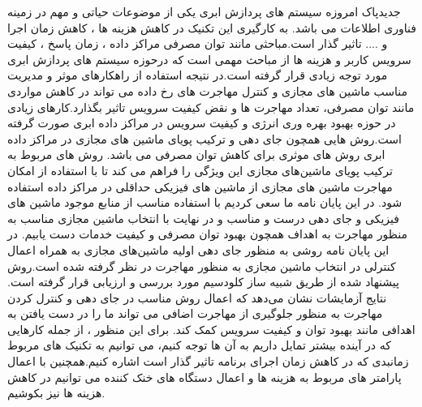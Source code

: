 ‌جدید‌پاک
امروزه سیستم های پردازش ابری یکی از موضوعات حیاتی و مهم در زمینه فناوری اطلاعات می باشد. به کارگیری این تکنیک در کاهش هزینه ها ، کاهش زمان اجرا و .... تاثیر گذار است.مباحثی مانند توان مصرفی مراکز داده ، زمان پاسخ ، کیفیت سرویس کاربر و هزینه  ها از مباحث مهمی است که درحوزه سیستم های پردازش ابری مورد توجه زیادی قرار گرفته است.در نتیجه استفاده از راهکارهای موثر و مدیریت مناسب ماشین های مجازی و کنترل مهاجرت های رخ داده می تواند در کاهش مواردی مانند توان مصرفی، تعداد مهاجرت ها و نقض کیفیت سرویس تاثیر بگذارد.کارهای زیادی در حوزه  بهبود بهره وری انرژی و کیفیت سرویس در مراکز داده ابری صورت گرفته است.روش هایی همچون جای دهی و ترکیب پویای ماشین های مجازی در مراکز داده ابری روش های موثری برای کاهش توان مصرفی می باشد. روش های مربوط به ترکیب پویای ماشین‌های مجازی این ویژگی را فراهم می کند تا با استفاده از امکان مهاجرت ماشین های مجازی از ماشین های فیزیکی حداقلی در مراکز داده استفاده شود. 
در این پایان نامه ما سعی کردیم با  استفاده مناسب از منابع موجود ماشین های فیزیکی و جای دهی درست و مناسب و در نهایت با انتخاب ماشین مجازی مناسب به منظور مهاجرت به اهداف همچون بهبود توان مصرفی و کیفیت خدمات دست یابیم. 
در این پایان نامه روشی به منظور جای دهی اولیه ماشین‌های مجازی به همراه اعمال کنترلی در انتخاب ماشین مجازی به منظور مهاجرت در نظر گرفته شده است.روش پیشنهاد شده از طریق شبیه ساز کلودسیم مورد بررسی و ارزیابی قرار گرفته است. نتایج آزمایشات نشان می‌دهد که اعمال روش مناسب در جای دهی و کنترل کردن مهاجرت به منظور جلوگیری از مهاجرت اضافی  می تواند ما را در دست یافتن به اهدافی مانند بهبود توان و کیفیت سرویس کمک کند.
برای این منظور ، از جمله کارهایی  که در آینده بیشتر  تمایل داریم به آن ها توجه کنیم، می توانیم به تکنیک های مربوط زمانبدی که در کاهش زمان اجرای برنامه تاثیر گذار است اشاره کنیم.همچنین با اعمال پارامتر های مربوط به هزینه ها و اعمال دستگاه های خنک کننده می توانیم در کاهش هزینه ها نیز بکوشیم. 
